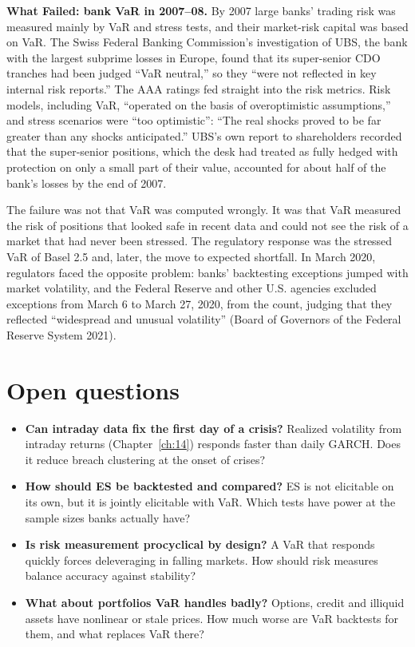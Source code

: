 \begin{callout}
\textbf{What Failed: bank VaR in 2007--08.} By 2007 large banks' trading risk was measured mainly by VaR and stress tests, and their market-risk capital was based on VaR. The Swiss Federal Banking Commission's investigation of UBS, the bank with the largest subprime losses in Europe, found that its super-senior CDO tranches had been judged ``VaR neutral,'' so they ``were not reflected in key internal risk reports.'' The AAA ratings fed straight into the risk metrics. Risk models, including VaR, ``operated on the basis of overoptimistic assumptions,'' and stress scenarios were ``too optimistic'': ``The real shocks proved to be far greater than any shocks anticipated.'' UBS's own report to shareholders recorded that the super-senior positions, which the desk had treated as fully hedged with protection on only a small part of their value, accounted for about half of the bank's losses by the end of 2007.

The failure was not that VaR was computed wrongly. It was that VaR measured the risk of positions that looked safe in recent data and could not see the risk of a market that had never been stressed. The regulatory response was the stressed VaR of Basel 2.5 and, later, the move to expected shortfall. In March 2020, regulators faced the opposite problem: banks' backtesting exceptions jumped with market volatility, and the Federal Reserve and other U.S. agencies excluded exceptions from March 6 to March 27, 2020, from the count, judging that they reflected ``widespread and unusual volatility'' (Board of Governors of the Federal Reserve System 2021).
\end{callout}

\section{Open questions}
\label{sec:15-open}

\begin{itemize}
  \item \textbf{Can intraday data fix the first day of a crisis?} Realized volatility from intraday returns (Chapter~\ref{ch:14}) responds faster than daily GARCH. Does it reduce breach clustering at the onset of crises?
  \item \textbf{How should ES be backtested and compared?} ES is not elicitable on its own, but it is jointly elicitable with VaR. Which tests have power at the sample sizes banks actually have?
  \item \textbf{Is risk measurement procyclical by design?} A VaR that responds quickly forces deleveraging in falling markets. How should risk measures balance accuracy against stability?
  \item \textbf{What about portfolios VaR handles badly?} Options, credit and illiquid assets have nonlinear or stale prices. How much worse are VaR backtests for them, and what replaces VaR there?
\end{itemize}

